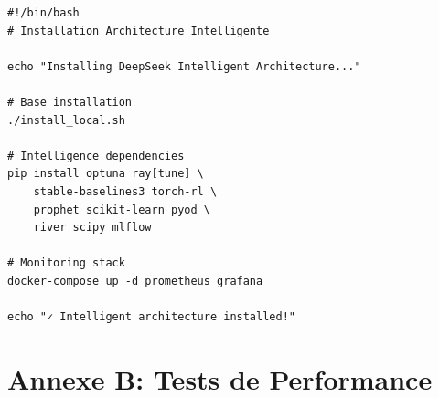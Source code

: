 \documentclass[12pt,a4paper]{article}
\begin{document}
\begin{lstlisting}[caption={install\_intelligent.sh}]
#!/bin/bash
# Installation Architecture Intelligente

echo "Installing DeepSeek Intelligent Architecture..."

# Base installation
./install_local.sh

# Intelligence dependencies
pip install optuna ray[tune] \
    stable-baselines3 torch-rl \
    prophet scikit-learn pyod \
    river scipy mlflow

# Monitoring stack
docker-compose up -d prometheus grafana

echo "✓ Intelligent architecture installed!"
\end{lstlisting}

\section{Annexe B: Tests de Performance}
\end{document}
